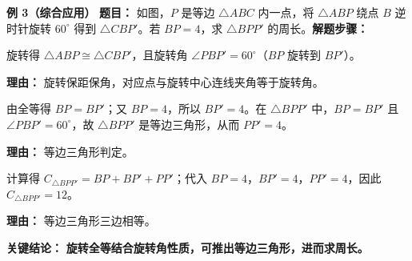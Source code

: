 \begin{examplebox}
	\medskip
	\textbf{\textcolor{CExample}{例 3（综合应用）}}
	\textbf{\textcolor{CExample}{题目：}} 如图，$P$ 是等边 $\triangle ABC$ 内一点，将 $\triangle ABP$ 绕点 $B$ 逆时针旋转 $60^\circ$ 得到 $\triangle CBP'$。若 $BP=4$，求 $\triangle BPP'$ 的周长。\textbf{\textcolor{CExample}{解题步骤：}}
	\begin{description}[style=nextline, leftmargin=2.8em, labelsep=0.5em, itemsep=0.45em]
		\item[\textbf{第一步（识别全等与旋转角）：}]
			旋转得 $\triangle ABP \cong \triangle CBP'$，且旋转角 $\angle PBP' = 60^\circ$（$BP$ 旋转到 $BP'$）。
			\par\textbf{理由：} 旋转保距保角，对应点与旋转中心连线夹角等于旋转角。
		\item[\textbf{第二步（得等边三角形）：}]
			由全等得 $BP = BP'$；又 $BP = 4$，所以 $BP' = 4$。在 $\triangle BPP'$ 中，$BP = BP'$ 且 $\angle PBP' = 60^\circ$，故 $\triangle BPP'$ 是等边三角形，从而 $PP' = 4$。
			\par\textbf{理由：} 等边三角形判定。
		\item[\textbf{第三步（求周长）：}]
			计算得 $C_{\triangle BPP'} = BP + BP' + PP'$；代入 $BP = 4$，$BP' = 4$，$PP' = 4$，因此 $C_{\triangle BPP'} = 12$。
			\par\textbf{理由：} 等边三角形三边相等。
	\end{description}
	\textbf{\textcolor{CExample}{关键结论：}}
	\textbf{旋转全等结合旋转角性质，可推出等边三角形，进而求周长。}
\end{examplebox}
